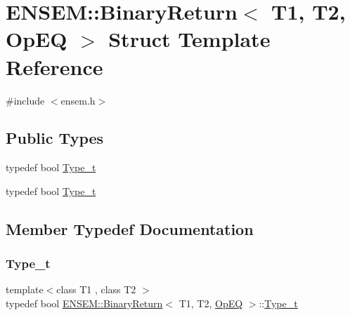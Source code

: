 \hypertarget{structENSEM_1_1BinaryReturn_3_01T1_00_01T2_00_01OpEQ_01_4}{}\section{E\+N\+S\+EM\+:\+:Binary\+Return$<$ T1, T2, Op\+EQ $>$ Struct Template Reference}
\label{structENSEM_1_1BinaryReturn_3_01T1_00_01T2_00_01OpEQ_01_4}


{\ttfamily \#include $<$ensem.\+h$>$}

\subsection*{Public Types}
\begin{DoxyCompactItemize}
\item 
typedef bool \mbox{\hyperlink{structENSEM_1_1BinaryReturn_3_01T1_00_01T2_00_01OpEQ_01_4_a78e18e010c85e91abd8944d6f76af63d}{Type\+\_\+t}}
\item 
typedef bool \mbox{\hyperlink{structENSEM_1_1BinaryReturn_3_01T1_00_01T2_00_01OpEQ_01_4_a78e18e010c85e91abd8944d6f76af63d}{Type\+\_\+t}}
\end{DoxyCompactItemize}


\subsection{Member Typedef Documentation}
\mbox{\label{structENSEM_1_1BinaryReturn_3_01T1_00_01T2_00_01OpEQ_01_4_a78e18e010c85e91abd8944d6f76af63d}} 
\subsubsection{\texorpdfstring{Type\_t}{Type\_t}\hspace{0.1cm}{\footnotesize\ttfamily [1/2]}}
{\footnotesize\ttfamily template$<$class T1 , class T2 $>$ \\
typedef bool \mbox{\hyperlink{structENSEM_1_1BinaryReturn}{E\+N\+S\+E\+M\+::\+Binary\+Return}}$<$ T1, T2, \mbox{\hyperlink{structENSEM_1_1OpEQ}{Op\+EQ}} $>$\+::\mbox{\hyperlink{structENSEM_1_1BinaryReturn_3_01T1_00_01T2_00_01OpEQ_01_4_a78e18e010c85e91abd8944d6f76af63d}{Type\+\_\+t}}}

